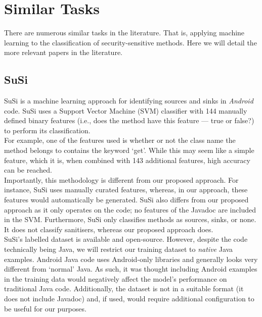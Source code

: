 \section{Similar Tasks}
There are numerous similar tasks in the literature. That is, applying machine learning to the classification of security-sensitive methods. Here we will detail the more relevant papers in the literature.

\subsection{SuSi}

\noindent
SuSi \cite{susi} is a machine learning approach for identifying sources and sinks in \emph{Android} code. SuSi uses a Support Vector Machine (SVM) classifier with 144 manually defined binary features (i.e., does the method have this feature --- true or false?) to perform its classification. \\

\noindent
For example, one of the features used is whether or not the class name the method belongs to contains the keyword `get'. While this may seem like a simple feature, which it is, when combined with 143 additional features, high accuracy can be reached.\\


\noindent
Importantly, this methodology is different from our proposed approach. For instance, SuSi uses manually curated features, whereas, in our approach, these features would automatically be generated. SuSi also differs from our proposed approach as it only operates on the code; no features of the Javadoc are included in the SVM. Furthermore, SuSi only classifies methods as sources, sinks, or none. It does not classify sanitisers, whereas our proposed approach does.\\

\noindent
SuSi's labelled dataset is available and open-source. However, despite the code technically being Java, we will restrict our training dataset to \emph{native} Java examples. Android Java code uses Android-only libraries and generally looks very different from `normal' Java. As such, it was thought including Android examples in the training data would negatively affect the model's performance on traditional Java code. Additionally, the dataset is not in a suitable format (it does not include Javadoc) and, if used, would require additional configuration to be useful for our purposes. \\


